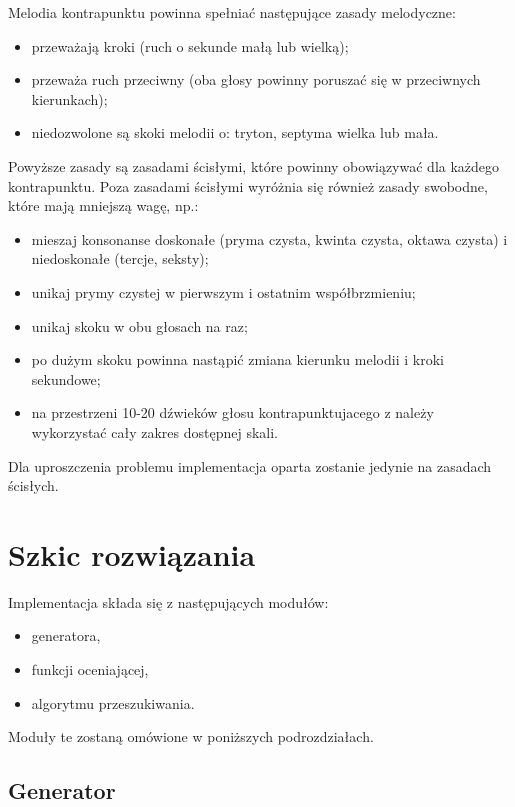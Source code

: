 \documentclass{article}
\begin{document}
Melodia kontrapunktu powinna spełniać następujące zasady melodyczne:

\begin{itemize}
\item przeważają kroki (ruch o sekunde małą lub wielką);
\item przeważa ruch przeciwny (oba głosy powinny poruszać się w przeciwnych kierunkach);
\item niedozwolone są skoki melodii o: tryton, septyma wielka lub mała.
\end{itemize}

Powyższe zasady są zasadami ścisłymi, które powinny obowiązywać dla każdego kontrapunktu. Poza zasadami ścisłymi wyróżnia się również zasady swobodne, które mają mniejszą wagę, np.:

\begin{itemize}
\item mieszaj konsonanse doskonałe (pryma czysta, kwinta czysta, oktawa czysta) i niedoskonałe (tercje, seksty);
\item unikaj prymy czystej w pierwszym i ostatnim współbrzmieniu;
\item unikaj skoku w obu głosach na raz;
\item po dużym skoku powinna nastąpić zmiana kierunku melodii i kroki sekundowe;
\item na przestrzeni 10-20 dźwieków głosu kontrapunktujacego z należy wykorzystać cały zakres dostępnej skali.
\end{itemize}

Dla uproszczenia problemu implementacja oparta zostanie jedynie na zasadach ścisłych.

\section{Szkic rozwiązania}

Implementacja składa się z następujących modułów:
\begin{itemize}
\item generatora,
\item funkcji oceniającej,
\item algorytmu przeszukiwania.
\end{itemize}

Moduły te zostaną omówione w poniższych podrozdziałach.

\subsection{Generator}
\end{document}
